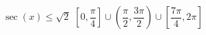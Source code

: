{ $\sec(x) \leq \sqrt{2}$}
{ $\left[0, \dfrac{\pi}{4} \right] \cup \left(\dfrac{\pi}{2}, \dfrac{3\pi}{2}\right) \cup \left[\dfrac{7\pi}{4}, 2\pi\right]$}
